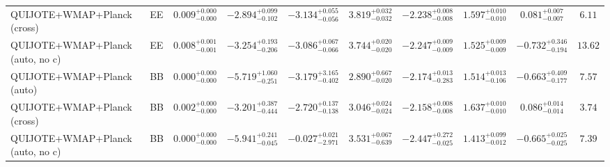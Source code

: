 \begin{table}[t]
\begin{tabular}{llcccccccc}
QUIJOTE+WMAP+Planck (cross) & EE & $0.009^{+0.000}_{-0.000}$ & $-2.894^{+0.099}_{-0.102}$ & $-3.134^{+0.055}_{-0.056}$ & $3.819^{+0.032}_{-0.032}$ & $-2.238^{+0.008}_{-0.008}$ & $1.597^{+0.010}_{-0.010}$ & $0.081^{+0.007}_{-0.007}$ & $6.11$ \\
QUIJOTE+WMAP+Planck (auto, no c) & EE & $0.008^{+0.001}_{-0.001}$ & $-3.254^{+0.193}_{-0.206}$ & $-3.086^{+0.067}_{-0.066}$ & $3.744^{+0.020}_{-0.020}$ & $-2.247^{+0.009}_{-0.009}$ & $1.525^{+0.009}_{-0.009}$ & $-0.732^{+0.346}_{-0.194}$ & $13.62$ \\
QUIJOTE+WMAP+Planck (auto) & BB & $0.000^{+0.000}_{-0.000}$ & $-5.719^{+1.060}_{-0.251}$ & $-3.179^{+3.165}_{-0.402}$ & $2.890^{+0.667}_{-0.020}$ & $-2.174^{+0.013}_{-0.283}$ & $1.514^{+0.013}_{-0.106}$ & $-0.663^{+0.409}_{-0.177}$ & $7.57$ \\
QUIJOTE+WMAP+Planck (cross) & BB & $0.002^{+0.000}_{-0.000}$ & $-3.201^{+0.387}_{-0.444}$ & $-2.720^{+0.137}_{-0.138}$ & $3.046^{+0.024}_{-0.024}$ & $-2.158^{+0.008}_{-0.008}$ & $1.637^{+0.010}_{-0.010}$ & $0.086^{+0.014}_{-0.014}$ & $3.74$ \\
QUIJOTE+WMAP+Planck (auto, no c) & BB & $0.000^{+0.000}_{-0.000}$ & $-5.941^{+0.241}_{-0.045}$ & $-0.027^{+0.021}_{-2.971}$ & $3.531^{+0.067}_{-0.639}$ & $-2.447^{+0.272}_{-0.025}$ & $1.413^{+0.099}_{-0.012}$ & $-0.665^{+0.025}_{-0.025}$ & $7.39$ \\
\bottomrule
\end{tabular}
\end{table}


